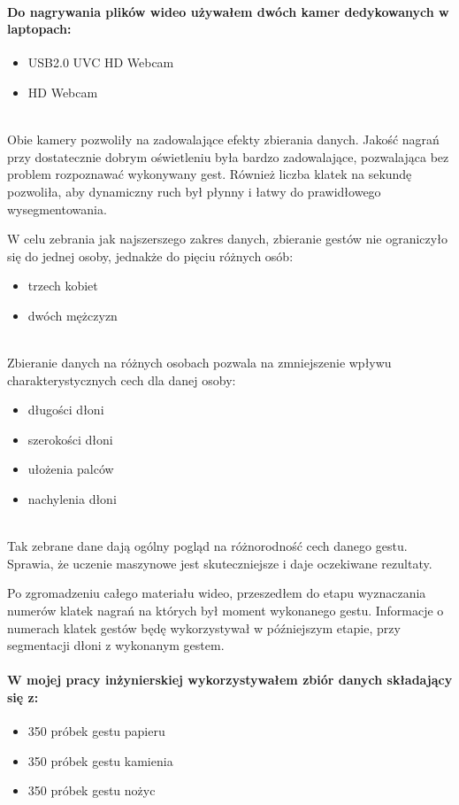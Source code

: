 \documentclass[a4paper,12pt,twoside,openany]{report}
\begin{document}
\paragraph{Do nagrywania plików wideo używałem dwóch kamer dedykowanych w laptopach:}
\begin{itemize}
	\item USB2.0 UVC HD Webcam
	\item HD Webcam
\end{itemize}
\mbox{} \\

Obie kamery pozwoliły na zadowalające efekty zbierania danych. Jakość nagrań przy dostatecznie dobrym oświetleniu była bardzo zadowalające, pozwalająca bez problem rozpoznawać wykonywany gest. Również liczba klatek na sekundę pozwoliła, aby dynamiczny ruch był płynny i łatwy do prawidłowego wysegmentowania.

W celu zebrania jak najszerszego zakres danych, zbieranie gestów nie ograniczyło się do jednej osoby, jednakże do pięciu różnych osób:
\begin{itemize}
	\item trzech kobiet
	\item dwóch mężczyzn
\end{itemize}
\mbox{} \\
\indent 
Zbieranie danych na różnych osobach pozwala na zmniejszenie wpływu charakterystycznych cech dla danej osoby:
\begin{itemize}
	\item długości dłoni
	\item szerokości dłoni
	\item ułożenia palców
	\item nachylenia dłoni
\end{itemize}
\mbox{} \\
\indent
Tak zebrane dane dają ogólny pogląd na różnorodność cech danego gestu. Sprawia, że uczenie maszynowe jest skuteczniejsze i daje oczekiwane rezultaty. 

Po zgromadzeniu całego materiału wideo, przeszedłem do etapu wyznaczania numerów klatek nagrań na których był moment wykonanego gestu. Informacje o numerach klatek gestów będę wykorzystywał w późniejszym etapie, przy segmentacji dłoni z wykonanym gestem.

\paragraph{W mojej pracy inżynierskiej wykorzystywałem zbiór danych składający się z:}
\begin{itemize}
	\item 350 próbek gestu papieru
	\item 350 próbek gestu kamienia
	\item 350 próbek gestu nożyc
\end{itemize}
\end{document}

